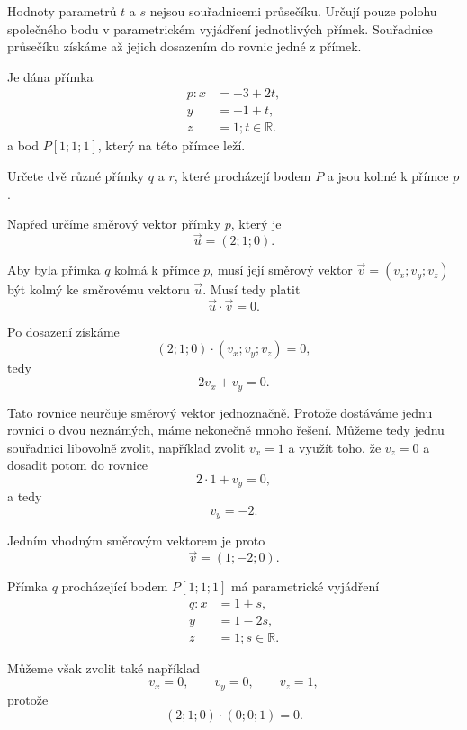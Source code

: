\begin{remark}
    Hodnoty parametrů $t$ a $s$ nejsou souřadnicemi průsečíku.
    Určují pouze polohu společného bodu v parametrickém vyjádření
    jednotlivých přímek. Souřadnice průsečíku získáme až jejich
    dosazením do rovnic jedné z přímek.
\end{remark}

\begin{example}
    \label{exa:Perpendicular_lines_through_point_space}
    Je dána přímka
    \[
        \begin{aligned}
            p: x&=-3+2t,\\
            y&=-1+t,\\
            z&=1; t\in\mathbb{R}.
        \end{aligned}
    \]
    a bod $P[1;1;1]$, který na této přímce leží.

    Určete dvě různé přímky $q$ a $r$, které procházejí bodem $P$
    a jsou kolmé k přímce $p$.

    Napřed určíme směrový vektor přímky $p$, který je
    \[
        \vec{u}=(2;1;0).
    \]

    Aby byla přímka $q$ kolmá k přímce $p$, musí její směrový vektor
    $\vec{v}=(v_x;v_y;v_z)$ být kolmý ke směrovému vektoru
    $\vec{u}$. Musí tedy platit
    \[
        \vec{u}\cdot\vec{v}=0.
    \]

    Po dosazení získáme
    \[
        (2;1;0)\cdot(v_x;v_y;v_z)=0,
    \]
    tedy
    \[
        2v_x+v_y=0.
    \]

    Tato rovnice neurčuje směrový vektor jednoznačně. Protože dostáváme jednu rovnici o dvou neznámých,
    máme nekonečně mnoho řešení. Můžeme tedy jednu souřadnici libovolně zvolit, například
    zvolit $v_x=1$ a využít toho, že $v_z=0$ a dosadit potom do rovnice
    \[
        2\cdot1+v_y=0,
    \]
    a tedy
    \[
        v_y=-2.
    \]

    Jedním vhodným směrovým vektorem je proto
    \[
        \vec{v}=(1;-2;0).
    \]

    Přímka $q$ procházející bodem $P[1;1;1]$ má parametrické
    vyjádření
    \[
        \begin{aligned}
            q: x&=1+s,\\
            y&=1-2s,\\
            z&=1; s\in\mathbb{R}.
        \end{aligned}
    \]

    Můžeme však zvolit také například
    \[
        v_x=0,\qquad v_y=0,\qquad v_z=1,
    \]
    protože
    \[
        (2;1;0)\cdot(0;0;1)=0.
    \]


\end{example}
